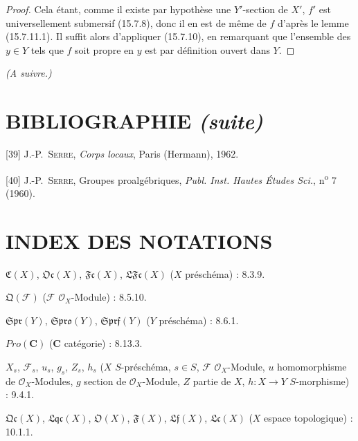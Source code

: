 \begin{proof}
Cela étant, comme il existe par hypothèse une $Y'$-section de $X'$, $f'$ est universellement submersif (15.7.8), donc il en est de même de $f$ d'après le lemme (15.7.11.1). Il suffit alors d'appliquer (15.7.10), en remarquant que l'ensemble des $y\in Y$ tels que $f$ soit propre en $y$ est par définition ouvert dans $Y$.
\end{proof}

\begin{center}
\emph{(A suivre.)}
\end{center}

\clearpage
{}
{}
\section*{BIBLIOGRAPHIE \textnormal{\emph{(suite)}}}

\begingroup
\small
\setlength{\parindent}{0pt}
\setlength{\parskip}{3pt}
[39] J.-P.~\textsc{Serre}, \emph{Corps locaux}, Paris (Hermann), 1962.

[40] J.-P.~\textsc{Serre}, Groupes proalgébriques, \emph{Publ. Inst. Hautes Études Sci.}, n\textsuperscript{o} 7 (1960).

\endgroup

\clearpage
{}
{}
\section*{INDEX DES NOTATIONS}

\begingroup
\small
\setlength{\parindent}{0pt}
\setlength{\parskip}{2pt}

$\mathfrak C(X)$, $\mathfrak{Oc}(X)$, $\mathfrak{Fc}(X)$,
$\mathfrak{LFc}(X)$ ($X$ préschéma) : 8.3.9.

$\mathfrak Q(\mathcal F)$ ($\mathcal F$ $\mathcal O_X$-Module) : 8.5.10.

$\mathfrak{Spr}(Y)$, $\mathfrak{Spro}(Y)$, $\mathfrak{Sprf}(Y)$
($Y$ préschéma) : 8.6.1.

$\boldsymbol{\mathit{Pro}}(\boldsymbol{C})$ ($\boldsymbol{C}$ catégorie) : 8.13.3.

$X_s$, $\mathcal F_s$, $u_s$, $g_s$, $Z_s$, $h_s$
($X$ $S$-préschéma, $s\in S$, $\mathcal F$ $\mathcal O_X$-Module,
$u$ homomorphisme de $\mathcal O_X$-Modules, $g$ section de
$\mathcal O_X$-Module, $Z$ partie de $X$, $h:X\to Y$ $S$-morphisme) : 9.4.1.

$\mathfrak{Qc}(X)$, $\mathfrak{Lqc}(X)$, $\mathfrak O(X)$,
$\mathfrak F(X)$, $\mathfrak{Lf}(X)$, $\mathfrak{Lc}(X)$
($X$ espace topologique) : 10.1.1.

